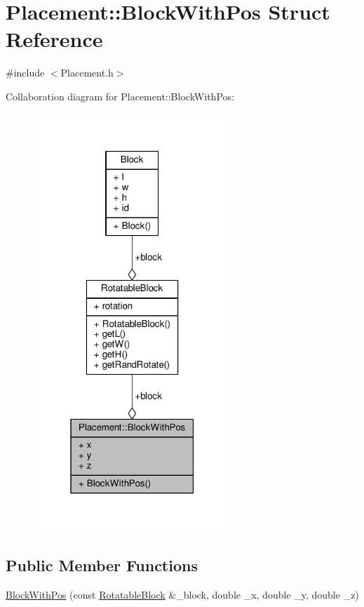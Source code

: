\hypertarget{structPlacement_1_1BlockWithPos}{}\section{Placement\+:\+:Block\+With\+Pos Struct Reference}
\label{structPlacement_1_1BlockWithPos}


{\ttfamily \#include $<$Placement.\+h$>$}



Collaboration diagram for Placement\+:\+:Block\+With\+Pos\+:\nopagebreak
\begin{figure}[H]
\begin{center}
\leavevmode
\includegraphics[width=211pt]{structPlacement_1_1BlockWithPos__coll__graph}
\end{center}
\end{figure}
\subsection*{Public Member Functions}
\begin{DoxyCompactItemize}
\item 
\hyperlink{structPlacement_1_1BlockWithPos_afb4a4cc160f62d32983def80899d01ac}{Block\+With\+Pos} (const \hyperlink{structRotatableBlock}{Rotatable\+Block} \&\+\_\+block, double \+\_\+x, double \+\_\+y, double \+\_\+z)
\end{DoxyCompactItemize}
